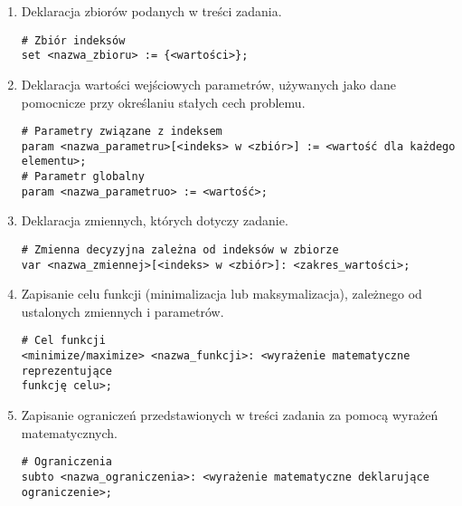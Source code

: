 \begin{enumerate}
\item Deklaracja zbiorów podanych w treści zadania.

\begin{lstlisting}[language=zimpl]
# Zbiór indeksów
set <nazwa_zbioru> := {<wartości>};
\end{lstlisting}

\item Deklaracja wartości wejściowych parametrów, używanych jako dane pomocnicze przy określaniu stałych cech problemu.

\begin{lstlisting}[language=zimpl]
# Parametry związane z indeksem
param <nazwa_parametru>[<indeks> w <zbiór>] := <wartość dla każdego elementu>;
# Parametr globalny
param <nazwa_parametruo> := <wartość>;
\end{lstlisting}

\item Deklaracja zmiennych, których dotyczy zadanie.

\begin{lstlisting}[language=zimpl]
# Zmienna decyzyjna zależna od indeksów w zbiorze
var <nazwa_zmiennej>[<indeks> w <zbiór>]: <zakres_wartości>;
\end{lstlisting}

\item Zapisanie celu funkcji (minimalizacja lub maksymalizacja), zależnego od ustalonych zmiennych i parametrów.

\begin{lstlisting}[language=zimpl]
# Cel funkcji
<minimize/maximize> <nazwa_funkcji>: <wyrażenie matematyczne reprezentujące
funkcję celu>;
\end{lstlisting}

\item Zapisanie ograniczeń przedstawionych w treści zadania za pomocą wyrażeń matematycznych.

\begin{lstlisting}[language=zimpl]
# Ograniczenia
subto <nazwa_ograniczenia>: <wyrażenie matematyczne deklarujące ograniczenie>;
\end{lstlisting}
\end{enumerate}

